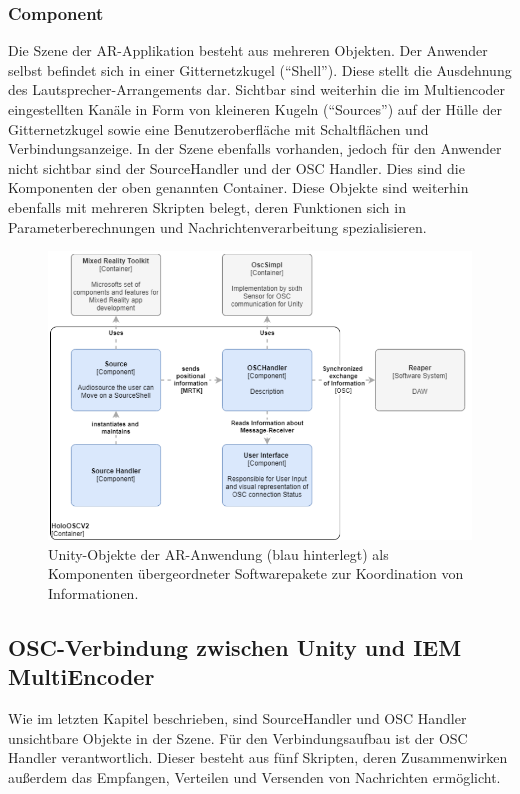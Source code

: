 \documentclass[11pt, titlepage, fleqn]{report}
\begin{document}
                \subsubsection*{Component}
                    Die Szene der AR-Applikation besteht aus mehreren Objekten. Der Anwender selbst befindet sich in einer 
                    Gitternetzkugel (“Shell”). Diese stellt die Ausdehnung des Lautsprecher-Arrangements dar. Sichtbar sind weiterhin 
                    die im Multiencoder eingestellten Kanäle in Form von kleineren Kugeln (“Sources”) auf der Hülle der Gitternetzkugel 
                    sowie eine Benutzeroberfläche mit Schaltflächen und Verbindungsanzeige. In der Szene ebenfalls vorhanden, jedoch 
                    für den Anwender nicht sichtbar sind der SourceHandler und der OSC Handler.
                    Dies sind die Komponenten der oben genannten Container. Diese Objekte sind weiterhin ebenfalls mit mehreren Skripten 
                    belegt, deren Funktionen sich in Parameterberechnungen und Nachrichtenverarbeitung spezialisieren. 
                    \begin{figure}[htbp]
                        \centering
                        \includegraphics[width=14cm]{./img/component.png}
                        \caption{Unity-Objekte der AR-Anwendung (blau hinterlegt) als Komponenten übergeordneter Softwarepakete zur Koordination von Informationen.\label{fig:container}}
                    \end{figure}
            \subsection{OSC-Verbindung zwischen Unity und IEM MultiEncoder}
            \label{sec:3.2.2}
            Wie im letzten Kapitel beschrieben, sind SourceHandler und OSC Handler unsichtbare Objekte in der Szene. 
            Für den Verbindungsaufbau ist der OSC Handler verantwortlich. Dieser besteht aus fünf Skripten, deren Zusammenwirken 
            außerdem das Empfangen, Verteilen und Versenden von Nachrichten ermöglicht. 
\end{document}

